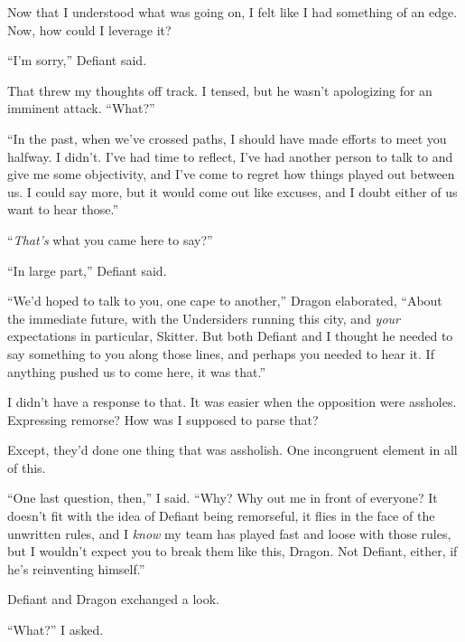 Now that I understood what was going on, I felt like I had something of an edge.  Now, how could I leverage it?



``I'm sorry,'' Defiant said.



That threw my thoughts off track.  I tensed, but he wasn't apologizing for an imminent attack.  ``What?''



``In the past, when we've crossed paths, I should have made efforts to meet you halfway.  I didn't.  I've had time to reflect, I've had another person to talk to and give me some objectivity, and I've come to regret how things played out between us.  I could say more, but it would come out like excuses, and I doubt either of us want to hear those.''



``\emph{That's} what you came here to say?''



``In large part,'' Defiant said.



``We'd hoped to talk to you, one cape to another,'' Dragon elaborated, ``About the immediate future, with the Undersiders running this city, and \emph{your} expectations in particular, Skitter.  But both Defiant and I thought he needed to say something to you along those lines, and perhaps you needed to hear it.  If anything pushed us to come here, it was that.''



I didn't have a response to that.  It was easier when the opposition were assholes.  Expressing remorse?  How was I supposed to parse that?



Except, they'd done one thing that was assholish.  One incongruent element in all of this.



``One last question, then,'' I said.  ``Why?  Why out me in front of everyone?  It doesn't fit with the idea of Defiant being remorseful, it flies in the face of the unwritten rules, and I \emph{know} my team has played fast and loose with those rules, but I wouldn't expect you to break them like this, Dragon.  Not Defiant, either, if he's reinventing himself.''



Defiant and Dragon exchanged a look.



``What?'' I asked.



